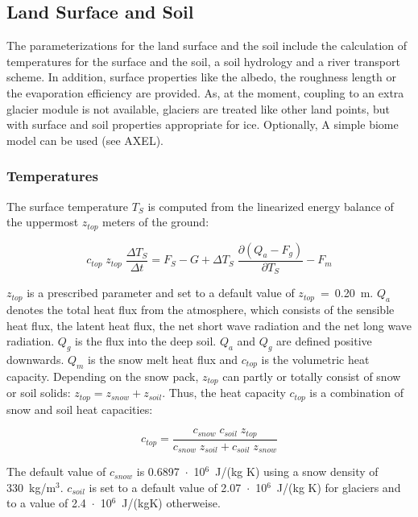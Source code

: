 \subsection{Land Surface and Soil \label{landmod}} 

The parameterizations for the land surface and the soil
include the calculation of temperatures
for the surface and the soil, a soil hydrology and a river
transport scheme. In addition, surface
properties like the albedo, the roughness length or the
evaporation efficiency are provided.
As, at the moment,  coupling to an extra glacier
module is not available, glaciers are treated like
other land points, but with surface and soil properties
appropriate for ice. Optionally, A simple biome model can be used (see AXEL).

\subsubsection{Temperatures}\label{surtemp}

The surface temperature $T_S$ is computed from
the linearized energy balance of the
uppermost $z_{top}$ meters of the ground:

\begin{equation} \label{land.1}
c_{top} \;  z_{top} \; \frac{\Delta T_S}{\Delta t}
= F_S - G + \Delta T_S \; \frac{\partial (Q_a
-F_g)}{\partial T_S}  - F_m
\end{equation}

$z_{top}$ is a prescribed parameter and set to a default
value of $z_{top}$~=~0.20~m.
$Q_a$ denotes the total heat flux from the atmosphere,
which consists of the sensible heat flux,
the latent heat flux, the net short wave radiation and the
net long wave radiation. $Q_g$ is the flux
into the deep soil. $Q_a$ and $Q_g$ are defined positive
downwards. $Q_m$ is the
snow melt heat flux and $c_{top}$  is the
volumetric heat capacity. Depending on the snow
pack, $z_{top}$ can partly or totally consist
of snow or soil solids:
$z_{top}=z_{snow}+z_{soil}$.  Thus, the heat
capacity $c_{top}$ is a
combination of snow and soil heat capacities:

\begin{equation}
c_{top} =\frac{ c_{snow} \; c_{soil} \; z_{top}}{c_{snow} \; z_{soil} +
c_{soil} \; z_{snow}}
\end{equation}

The default value of
$c_{snow}$ is
0.6897~$\cdot$~10$^{6}$~J/(kg K) using a snow
density
of 330~kg/m$^3$. $c_{soil}$ is set to a default value
of 2.07~$\cdot$~10$^{6}$~J/(kg K) for
glaciers and to a value of 2.4~$\cdot$~10$^{6}$~J/(kgK) otherweise.

